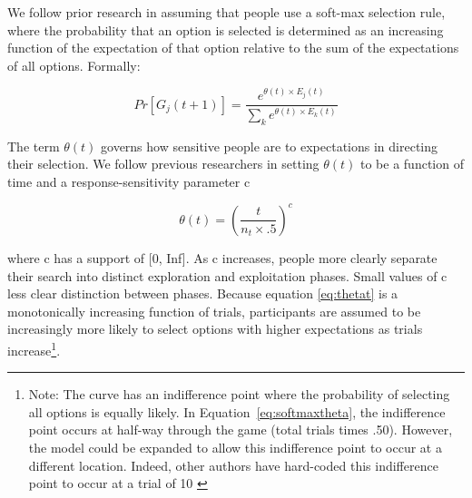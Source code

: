 \documentclass[a4paper,doc,natbib,floatsintext]{apa6}\usepackage[]{graphicx}\usepackage[]{color}
\begin{document}
We follow prior research in assuming that people use a soft-max selection rule, where the probability that an option is selected is determined as an increasing function of the expectation of that option relative to the sum of the expectations of all options. Formally:

\begin{center}
\begin{equation}

Pr[G_{j}(t+1)]=\frac{e^{\theta(t) \times E_{j}(t)}}{\sum_{k}e^{\theta(t) \times E_{k}(t)}}


\end{equation}
\end{center}

The term $\theta(t)$ governs how sensitive people are to expectations in directing their selection. We follow previous researchers \citep{yechiam2005models} in setting $\theta(t)$ to be a function of time and a response-sensitivity parameter c

\begin{center}
\begin{equation}
\label{eq:thetat}

\theta(t) = (\frac{t}{n_{t} \times .5})^{c}

\label{eq:softmaxtheta}
\end{equation}
\end{center}

where c has a support of [0, Inf]. As c increases, people more clearly separate their search into distinct exploration and exploitation phases. Small values of c less clear distinction between phases. Because equation \ref{eq:thetat} is a monotonically increasing function of trials, participants are assumed to be increasingly more likely to select options with higher expectations as trials increase\footnote{Note: The curve has an indifference point where the probability of selecting all options is equally likely. In Equation~\ref{eq:softmaxtheta}, the indifference point occurs at half-way through the game (total trials times .50). However, the model could be expanded to allow this indifference point to occur at a different location. Indeed, other authors have hard-coded this indifference point to occur at a trial of 10 \citep{yechiam2005models}}.
\end{document}
